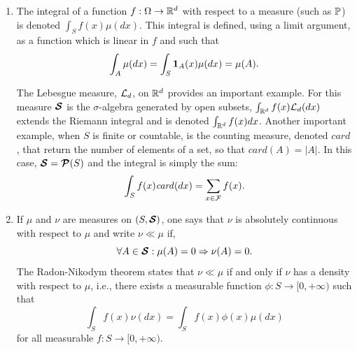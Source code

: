 \begin{enumerate}[label={\bf \arabic*.}]
However, there will be situations in which the flexibility of the measure-theoretic formalism is needed for the exposition. The following notions may  help the reader navigate through these situations (basic references in measure theory are \citet{rudin1966real,dudley2018real,billingsley2013convergence}).

 A measurable space is a pair $(S, \boldsymbol{\CS})$ where $S$ is a set and $\boldsymbol{\CS} \subset \twop{S}$ contains $S$, is stable by complementation (if $A\in \boldsymbol{\CS}$, then $A^c = S\setminus A\in \boldsymbol{\CS}$), by countable unions and intersections. Such an $\boldsymbol{\CS}$ is called a $\sigma$-algebra and elements of $\boldsymbol{\CS}$ form the measurable subsets of $S$ (relative to the $\sigma$-algebra).

A (positive) measure $\mu$ on $(S, \boldsymbol{\CS})$ in a mapping from $\boldsymbol{\CS} \to [0, +\infty)$ that associates to $A\in \boldsymbol{\CS}$ its measure $\mu(A)$, such that the measure of a countable union of disjoint sets is the countable sum of their measures. A function $f:\Omega \to \mR^d$ is called measurable if the inverse images by $f$ of open subsets of $\mR^d$ are mesurable.

A measurable set $A$ (or event) is negligible (for $\myP$) if $\myP(A) = 0$ and events are said to happen almost surely if their complements are negligible, i.e.,  $\myP(A^c) = 0$. 

\item
The integral of a function $f: \Omega \to \mR^d$ with respect to a measure (such as $\myP$) is denoted
$\int_S f(x) \mu(dx)$. This integral is defined, using a limit argument, as a  function which is linear in $f$ and such that
\[
\int_A \mu(dx) = \int_S {\bm 1}_A(x) \mu(dx) = \mu(A).
\]

The Lebesgue measure, ${\mathcal L}_d$, on $\mR^d$ provides an important example. For this measure $\boldsymbol{\CS}$ is the $\sigma$-algebra generated by open subsets,  $\int_{{\mathbb{R}}^d} f(x) {\mathcal L}_d(dx)$ extends the Riemann integral and is denoted $\int_{{\mathbb{R}}^d} f(x) dx$. Another important example, when $S$ is finite or countable, is the counting measure, denoted $\mathit{card}$, that return the number of elements of a set, so that $\mathit{card}(A) = |A|$. In this case, $\bm{{\mathcal S}} = {\bm{\mathcal P}({S})}$ and the integral is simply the sum:
\[
\int_S f(x) \mathit{card}(dx) = \sum_{x\in {\mathcal F}} f(x).
\]

\item
If $\mu$ and $\nu$ are measures on $(S , \boldsymbol{\CS})$, one says that $\nu$ is absolutely continuous with respect to $\mu$ and write $\nu \ll \mu$ if,
\begin{equation}
\label{eq:abs.cont}
\forall A\in \bm{{\mathcal S}}:
\mu(A) = 0 \Rightarrow \nu(A) = 0.
\end{equation}
 The Radon-Nikodym theorem states that $\nu\ll \mu$ if and only if $\nu$ has a density with respect to $\mu$, i.e., there exists a measurable function $\phi: S\to [0, +\infty)$ such that 
\[
\int_S f(x) \nu(dx) = \int_S f(x) \phi(x) \mu(dx)
\]
for all measurable $f:S \to[0, +\infty)$.


\end{enumerate}

